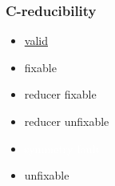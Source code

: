 \begin{frame}
    \frametitle{C-reducibility}

    \begin{itemize}
        \item \colorbox{g0}{\underline{valid}} 
        \item \colorbox{g0}{fixable} 
        \item \colorbox{rg}{reducer fixable}
        \item \colorbox{rb}{reducer unfixable}
        \item \colorbox{sf}{\textcolor{white}{symmetry fault}}
        \item unfixable
    \end{itemize}
    \begin{figure}
    \end{figure}
\end{frame}

